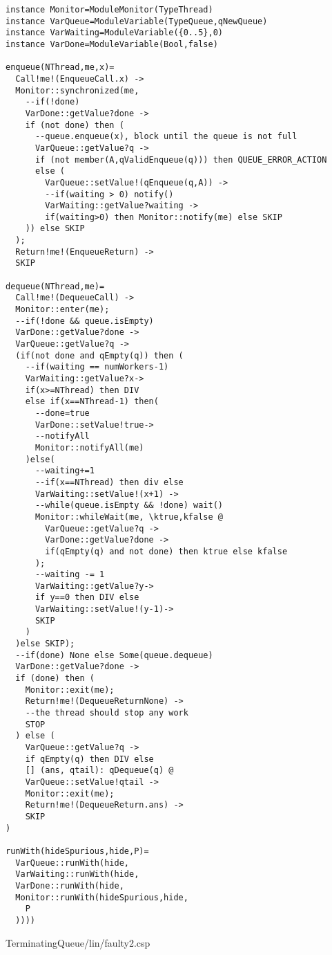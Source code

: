 \begin{lstlisting}
instance Monitor=ModuleMonitor(TypeThread)
instance VarQueue=ModuleVariable(TypeQueue,qNewQueue)
instance VarWaiting=ModuleVariable({0..5},0)
instance VarDone=ModuleVariable(Bool,false)

enqueue(NThread,me,x)=
  Call!me!(EnqueueCall.x) ->
  Monitor::synchronized(me,
    --if(!done)
    VarDone::getValue?done ->
    if (not done) then (
      --queue.enqueue(x), block until the queue is not full
      VarQueue::getValue?q ->
      if (not member(A,qValidEnqueue(q))) then QUEUE_ERROR_ACTION
      else (
        VarQueue::setValue!(qEnqueue(q,A)) ->
        --if(waiting > 0) notify()
        VarWaiting::getValue?waiting ->
        if(waiting>0) then Monitor::notify(me) else SKIP
    )) else SKIP
  );
  Return!me!(EnqueueReturn) ->
  SKIP
  
dequeue(NThread,me)=
  Call!me!(DequeueCall) ->
  Monitor::enter(me);
  --if(!done && queue.isEmpty)
  VarDone::getValue?done ->
  VarQueue::getValue?q ->
  (if(not done and qEmpty(q)) then (
    --if(waiting == numWorkers-1)
    VarWaiting::getValue?x->
    if(x>=NThread) then DIV
    else if(x==NThread-1) then(
      --done=true
      VarDone::setValue!true->
      --notifyAll
      Monitor::notifyAll(me)
    )else(
      --waiting+=1
      --if(x==NThread) then div else
      VarWaiting::setValue!(x+1) ->
      --while(queue.isEmpty && !done) wait()
      Monitor::whileWait(me, \ktrue,kfalse @
        VarQueue::getValue?q ->
        VarDone::getValue?done ->
        if(qEmpty(q) and not done) then ktrue else kfalse
      );
      --waiting -= 1
      VarWaiting::getValue?y->
      if y==0 then DIV else 
      VarWaiting::setValue!(y-1)->
      SKIP
    )
  )else SKIP);
  --if(done) None else Some(queue.dequeue)
  VarDone::getValue?done ->
  if (done) then (
    Monitor::exit(me);
    Return!me!(DequeueReturnNone) ->
    --the thread should stop any work
    STOP
  ) else (
    VarQueue::getValue?q ->
    if qEmpty(q) then DIV else
    [] (ans, qtail): qDequeue(q) @
    VarQueue::setValue!qtail ->
    Monitor::exit(me);
    Return!me!(DequeueReturn.ans) ->
    SKIP
)

runWith(hideSpurious,hide,P)=
  VarQueue::runWith(hide,
  VarWaiting::runWith(hide,
  VarDone::runWith(hide,
  Monitor::runWith(hideSpurious,hide,
    P
  ))))
\end{lstlisting}
TerminatingQueue/lin/faulty2.csp
